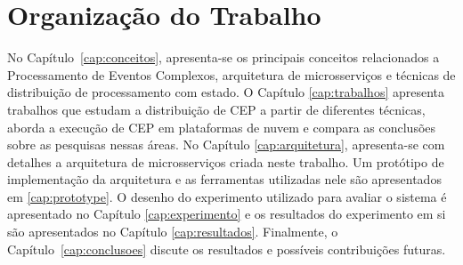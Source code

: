


\section{Organização do Trabalho}
\label{sec:organizacao_trabalho}


No Capítulo~\ref{cap:conceitos}, apresenta-se os principais conceitos relacionados a Processamento de Eventos Complexos, arquitetura de microsserviços e técnicas de distribuição de processamento com estado. O Capítulo \ref{cap:trabalhos} apresenta trabalhos que estudam a distribuição de CEP a partir de diferentes técnicas, aborda a execução de CEP em plataformas de nuvem e compara as conclusões sobre as pesquisas nessas áreas. No Capítulo \ref{cap:arquitetura}, apresenta-se com detalhes a arquitetura de microsserviços criada neste trabalho. Um protótipo de implementação da arquitetura e as ferramentas utilizadas nele  são apresentados em \ref{cap:prototype}. O desenho do experimento utilizado para avaliar o sistema é apresentado no Capítulo \ref{cap:experimento} e os resultados do experimento em si são apresentados no Capítulo \ref{cap:resultados}. Finalmente, o Capítulo~\ref{cap:conclusoes} discute os resultados e  possíveis contribuições futuras.

